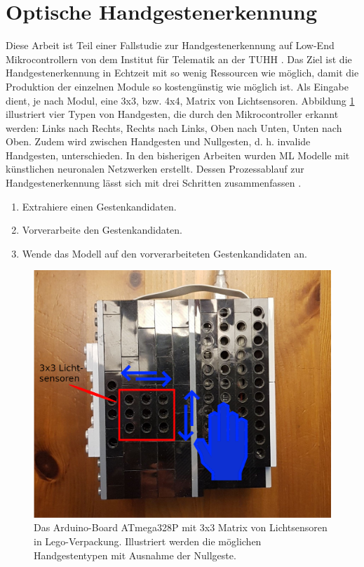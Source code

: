 \section{Optische Handgestenerkennung}
\label{sec:fallstudie}
Diese Arbeit ist Teil einer Fallstudie zur Handgestenerkennung auf Low-End Mikrocontrollern von dem Institut für Telematik an der TUHH \cite{venzkeArticle}. Das Ziel ist die Handgestenerkennung in Echtzeit mit so wenig
Ressourcen wie möglich, damit die Produktion der einzelnen Module so kostengünstig wie möglich ist. Als Eingabe dient, je nach Modul, eine 3x3, bzw. 4x4, Matrix von Lichtsensoren. Abbildung \ref{fig:arduino_ex}
illustriert vier Typen von Handgesten, die durch den Mikrocontroller erkannt werden: Links nach Rechts, Rechts nach Links, Oben nach Unten, Unten nach Oben. Zudem wird zwischen Handgesten und Nullgesten, d. h.
invalide Handgesten, unterschieden. In den bisherigen Arbeiten wurden ML Modelle mit künstlichen neuronalen Netzwerken erstellt. Dessen Prozessablauf zur Handgestenerkennung lässt sich mit drei
Schritten zusammenfassen \cite{venzkeArticle}.
\begin{enumerate}
    \item Extrahiere einen Gestenkandidaten.
    \item Vorverarbeite den Gestenkandidaten.
    \item Wende das Modell auf den vorverarbeiteten Gestenkandidaten an.
\end{enumerate}
\begin{figure}
    \centering
    \includegraphics[width=0.6\linewidth]{images/arduino_ex.png}
    \caption{Das Arduino-Board ATmega328P mit 3x3 Matrix von Lichtsensoren in Lego-Verpackung. Illustriert werden die möglichen Handgestentypen mit Ausnahme der Nullgeste.}
    \label{fig:arduino_ex}
\end{figure}






